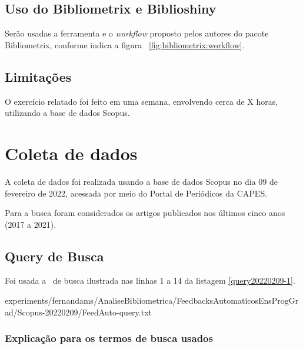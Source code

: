 
\subsection{Uso do Bibliometrix e Biblioshiny}
Serão usadas a ferramenta e o \textit{workflow} proposto pelos autores do pacote Bibliometrix, conforme indica a figura ~\ref{fig:bibliometrix:workflow}.

\subsection{Limitações} 

O exercício relatado foi feito em uma semana, envolvendo cerca de X horas, utilizando a base de dados Scopus.

\section{Coleta de dados \label{FeedAuto:coleta}}

A coleta de dados foi realizada usando a base de dados Scopus no dia 09 de fevereiro de 2022, acessada por meio do Portal de Periódicos da CAPES.

Para a busca foram considerados os artigos publicados nos últimos cinco anos (2017 a 2021).

\subsection{Query de Busca}

Foi usada a \query\  de busca ilustrada nas linhas 1 a 14 da listagem \ref{query20220209-1}.


{experiments/fernandams/AnaliseBibliometrica/FeedbacksAutomaticosEnsProgGrad/Scopus-20220209/FeedAuto-query.txt}

\subsubsection{Explicação para os termos de busca usados\label{FeedAuto:query}}

